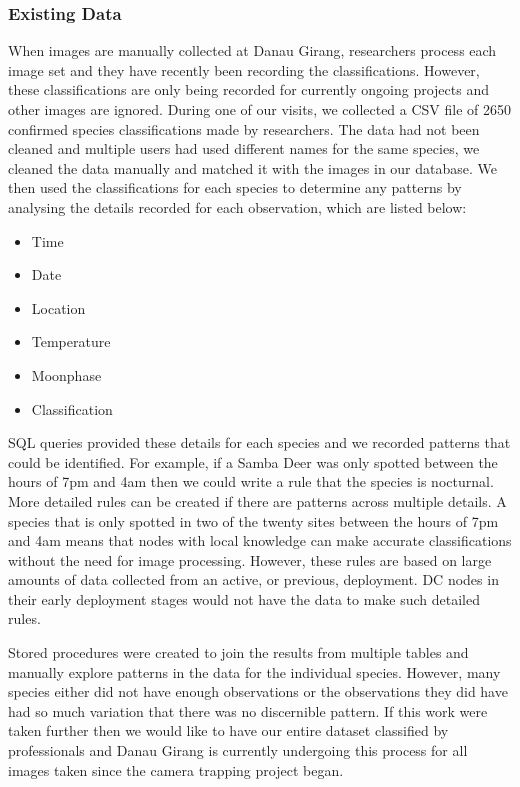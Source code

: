 			\subsubsection{Existing Data}
			When images are manually collected at Danau Girang, researchers process each image set and they have recently been recording the classifications. However, these classifications are only being recorded for currently ongoing projects and other images are ignored. During one of our visits, we collected a CSV file of 2650 confirmed species classifications made by researchers. The data had not been cleaned and multiple users had used different names for the same species, we cleaned the data manually and matched it with the images in our database.
			We then used the classifications for each species to determine any patterns by analysing the details recorded for each observation, which are listed below:
			\begin{itemize}
				\item Time
				\item Date
				\item Location
				\item Temperature
				\item Moonphase
				\item Classification
			\end{itemize}
			
			SQL queries provided these details for each species and we recorded patterns that could be identified. For example, if a Samba Deer was only spotted between the hours of 7pm and 4am then we could write a rule that the species is nocturnal. More detailed rules can be created if there are patterns across multiple details. A species that is only spotted in two of the twenty sites between the hours of 7pm and 4am means that nodes with local knowledge can make accurate classifications without the need for image processing. However, these rules are based on large amounts of data collected from an active, or previous, deployment. DC nodes in their early deployment stages would not have the data to make such detailed rules.

			Stored procedures were created to join the results from multiple tables and manually explore patterns in the data for the individual species. However, many species either did not have enough observations or the observations they did have had so much variation that there was no discernible pattern. If this work were taken further then we would like to have our entire dataset classified by professionals and Danau Girang is currently undergoing this process for all images taken since the camera trapping project began.


